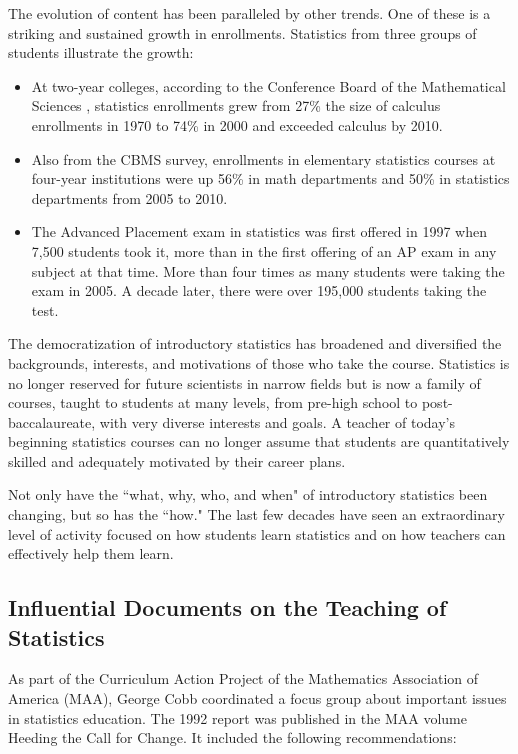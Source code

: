 The evolution of content has been paralleled by other trends. One of these is a striking and sustained growth in enrollments. Statistics from three groups of students illustrate the growth:
\begin{itemize}
\item At two-year colleges, according to the Conference Board of the Mathematical Sciences , statistics enrollments grew from 27\% the size of calculus enrollments in 1970 to 74\% in 2000 and exceeded calculus by 2010.
\item Also from the CBMS survey, enrollments in elementary statistics courses at four-year institutions were up 56\% in math departments and 50\% in statistics departments from 2005 to 2010.  
\item The Advanced Placement exam in statistics was first offered in 1997 when 7,500 students took it, more than in the first offering of an AP exam in any subject at that time. More than four times as many students were taking the exam in 2005.  A decade later, there were over 195,000 students taking the test.
\end{itemize}

The democratization of introductory statistics has broadened and diversified the backgrounds, interests, and motivations of those who take the course. Statistics is no longer reserved for future scientists in narrow fields but is now a family of courses, taught to students at many levels, from pre-high school to post-baccalaureate, with very diverse interests and goals. A teacher of today's beginning statistics courses can no longer assume that students are quantitatively skilled and adequately motivated by their career plans. 

Not only have the ``what, why, who, and when" of introductory statistics been changing, but so has the ``how." The last few decades have seen an extraordinary level of activity focused on how students learn statistics and on how teachers can effectively help them learn.


\subsection{Influential Documents on the Teaching of Statistics}

As part of the Curriculum Action Project of the Mathematics Association of America (MAA), George Cobb coordinated a focus group about important issues in statistics education. The 1992 report was published in the MAA volume Heeding the Call for Change. It included the following recommendations:

